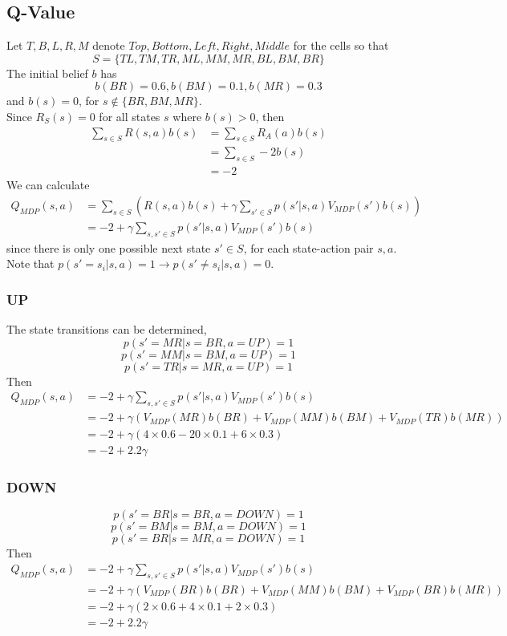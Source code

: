 \subsection{Q-Value}
Let $T,B,L,R,M$ denote $Top,Bottom,Left,Right,Middle$ for the cells
so that
\[S=\{TL,TM,TR,ML,MM,MR,BL,BM,BR\}\]
The initial belief $b$ has
\[b(BR)=0.6,b(BM)=0.1,b(MR)=0.3\]
and $b(s)=0$, for $s\notin \{BR,BM,MR\}$.\\
Since $R_S(s)=0$ for all states $s$ where $b(s)>0$, then
\begin{equation}
\begin{aligned}
    \sum_{s\in S}R(s,a)b(s)&=\sum_{s\in S}R_A(a)b(s)\\
    &=\sum_{s\in S}-2b(s)\\
    &= -2
\end{aligned}
\end{equation}
We can calculate
\begin{equation}
\begin{aligned}
    Q_{MDP}(s,a)
    &=\sum_{s\in S} 
    \left(R(s,a)b(s)+\gamma\sum_{s'\in S}p(s'|s,a)V_{MDP}(s')b(s)\right)\\
    &=-2 + \gamma \sum_{s,s'\in S} p(s'|s,a)V_{MDP}(s')b(s)
\end{aligned}
\end{equation}
since there is only one possible next state $s'\in S$,
for each state-action pair $s,a$.\\
Note that $p(s'=s_i|s,a)=1\rightarrow p(s'\neq s_i|s,a)=0$.

\subsubsection{UP}
The state transitions can be determined,
\[p(s'=MR|s=BR,a=UP)=1\]
\[p(s'=MM|s=BM,a=UP)=1\]
\[p(s'=TR|s=MR,a=UP)=1\]
Then
\begin{equation}
\begin{aligned}
    Q_{MDP}(s,a) 
    &=-2 + \gamma \sum_{s,s'\in S} p(s'|s,a)V_{MDP}(s')b(s)\\
    &= -2 + \gamma(V_{MDP}(MR)b(BR)+V_{MDP}(MM)b(BM)+V_{MDP}(TR)b(MR))\\
    &= -2 + \gamma(4\times 0.6 -20\times 0.1+6\times 0.3)\\
    &= -2 + 2.2\gamma
\end{aligned}
\end{equation}

\subsubsection{DOWN}
\[p(s'=BR|s=BR,a=DOWN)=1\]
\[p(s'=BM|s=BM,a=DOWN)=1\]
\[p(s'=BR|s=MR,a=DOWN)=1\]
Then
\begin{equation}
\begin{aligned}
    Q_{MDP}(s,a) 
    &=-2 + \gamma \sum_{s,s'\in S} p(s'|s,a)V_{MDP}(s')b(s)\\
    &= -2 + \gamma(V_{MDP}(BR)b(BR)+V_{MDP}(MM)b(BM)+V_{MDP}(BR)b(MR))\\
    &= -2 + \gamma(2\times 0.6 +4\times 0.1+2\times 0.3)\\
    &= -2 + 2.2\gamma
\end{aligned}
\end{equation}

